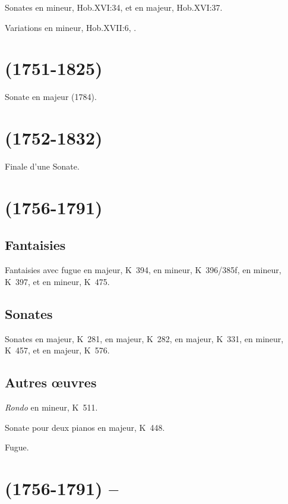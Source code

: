 Sonates  en \kE mineur, Hob.XVI:34, et  en \kD majeur,
Hob.XVI:37.

Variations en \kF mineur, Hob.XVII:6, .

\section[%
Dmitrij Bortnjanskij (1751-1825)]{%
\DBortnianski{} (1751-1825)}

Sonate en \kC majeur (1784).

\section[%
Muzio Clementi (1752-1832)]{%
\MClementi{} (1752-1832)}

Finale d'une Sonate.

\section[%
Wolfgang Amadeus Mozart (1756-1791)]{%
\WMozart{} (1756-1791)}

\subsection{Fantaisies}

Fantaisies  avec fugue en \kC majeur, K~394,  en \kC
mineur, K~396/385f,  en \kD mineur, K~397, et  en \kC
mineur, K~475.

\subsection{Sonates}

Sonates  en \kB \Flat majeur, K~281,  en \kE \Flat
majeur, K~282,  en \kA majeur, K~331,  en \kC mineur,
K~457, et  en \kD majeur, K~576.

\subsection{Autres œuvres}

\emph{Rondo}  en \kA mineur, K~511.

Sonate pour deux pianos en \kD majeur, K~448.

Fugue.

\section[%
Wolfgang Amadeus Mozart (1756-1791) -- Ferruccio Busoni]{%
\WMozart{} (1756-1791) -- \FBusoni{}}

